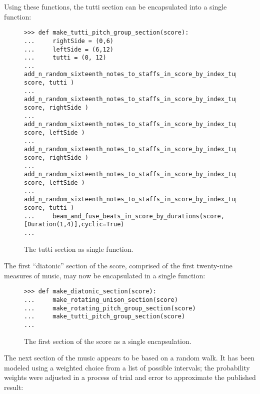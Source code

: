 Using these functions, the tutti section can be encapsulated into a single function:

\begin{figure}
\begin{lstlisting}[basicstyle=\scriptsize\ttfamily, breaklines=True, tabsize=4, showtabs=false, showspaces=false]
>>> def make_tutti_pitch_group_section(score):
...     rightSide = (0,6)
...     leftSide = (6,12)
...     tutti = (0, 12)
...     add_n_random_sixteenth_notes_to_staffs_in_score_by_index_tuple(40, score, tutti )
...     add_n_random_sixteenth_notes_to_staffs_in_score_by_index_tuple(6, score, rightSide )
...     add_n_random_sixteenth_notes_to_staffs_in_score_by_index_tuple(5, score, leftSide )
...     add_n_random_sixteenth_notes_to_staffs_in_score_by_index_tuple(4, score, rightSide )
...     add_n_random_sixteenth_notes_to_staffs_in_score_by_index_tuple(6, score, leftSide )
...     add_n_random_sixteenth_notes_to_staffs_in_score_by_index_tuple(31, score, tutti )
...     beam_and_fuse_beats_in_score_by_durations(score, [Duration(1,4)],cyclic=True)
... \end{lstlisting}

\caption{The tutti section as single function. } 
\end{figure}

The first ``diatonic'' section of the score, comprised of the first twenty-nine measures of music, may now be encapsulated in a single function:

\begin{figure}[H]
\begin{lstlisting}[basicstyle=\scriptsize\ttfamily, breaklines=True, tabsize=4, showtabs=false, showspaces=false]
>>> def make_diatonic_section(score):
...     make_rotating_unison_section(score)
...     make_rotating_pitch_group_section(score)
...     make_tutti_pitch_group_section(score)
... \end{lstlisting}

\caption{The first section of the score as a single encapsulation. } 
\end{figure}
The next section of the music appears to be based on a random walk. It has been modeled using a weighted choice from a list of possible intervals; the probability weights were adjusted in a process of trial and error to approximate the published result:

